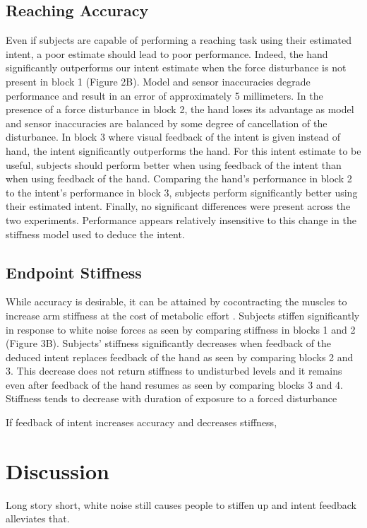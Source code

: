 \documentclass[letterpaper, 10 pt, conference]{ieeeconf}  %
\begin{document}
\subsection*{Reaching Accuracy}
Even if subjects are capable of performing a reaching task using their estimated intent, a poor estimate should lead to poor performance. Indeed, the hand significantly outperforms our intent estimate when the force disturbance is not present in block 1 (Figure 2B). Model and sensor inaccuracies degrade performance and result in an error of approximately 5 millimeters. In the presence of a force disturbance in block 2, the hand loses its advantage as model and sensor inaccuracies are balanced by some degree of cancellation of the disturbance. In block 3 where visual feedback of the intent is given instead of hand, the intent significantly outperforms the hand. For this intent estimate to be useful, subjects should perform better when using feedback of the intent than when using feedback of the hand. Comparing the hand's performance in block 2 to the intent's performance in block 3, subjects perform significantly better using their estimated intent. Finally, no significant differences were present across the two experiments. Performance appears relatively insensitive to this change in the stiffness model used to deduce the intent.

\subsection*{Endpoint Stiffness}
While accuracy is desirable, it can be attained by cocontracting the muscles to increase arm stiffness at the cost of metabolic effort \cite{gribble2003role}\cite{takahashi2001impedance}. Subjects stiffen significantly in response to white noise forces as seen by comparing stiffness in blocks 1 and 2 (Figure 3B). Subjects' stiffness significantly decreases when feedback of the deduced intent replaces feedback of the hand as seen by comparing blocks 2 and 3. This decrease does not return stiffness to undisturbed levels and it remains even after feedback of the hand resumes as seen by comparing blocks 3 and 4. Stiffness tends to decrease with duration of exposure to a forced disturbance\cite{o}

 If feedback of intent increases accuracy and decreases stiffness, 


\section{Discussion}
Long story short, white noise still causes people to stiffen up and intent feedback alleviates that.
\end{document}
